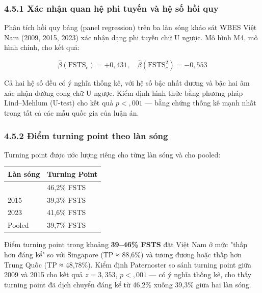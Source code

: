 \documentclass[12pt,a4paper]{article}
\begin{document}
\hypertarget{451-xuxe1c-nhux1eadn-quan-hux1ec7-phi-tuyux1ebfn-vuxe0-hux1ec7-sux1ed1-hux1ed3i-quy}{%
\subsubsection{4.5.1 Xác nhận quan hệ phi tuyến và hệ số hồi
quy}\label{451-xuxe1c-nhux1eadn-quan-hux1ec7-phi-tuyux1ebfn-vuxe0-hux1ec7-sux1ed1-hux1ed3i-quy}}

Phân tích hồi quy bảng (panel regression) trên ba làn sóng khảo sát WBES
Việt Nam (2009, 2015, 2023) xác nhận dạng phi tuyến chữ U ngược. Mô hình
M4, mô hình chính, cho kết quả:

\[\hat{\beta}(\text{FSTS}_c) = +0{,}431, \quad \hat{\beta}(\text{FSTS}_c^2) = -0{,}553\]

Cả hai hệ số đều có ý nghĩa thống kê, với hệ số bậc nhất dương và bậc
hai âm xác nhận đường cong chữ U ngược. Kiểm định hình thức bằng phương
pháp Lind--Mehlum (U-test) cho kết quả \(p < {,}001\) --- bằng chứng
thống kê mạnh nhất trong tất cả các mẫu quốc gia của luận án.

\hypertarget{452-ux111iux1ec3m-turning-point-theo-luxe0n-suxf3ng}{%
\subsubsection{4.5.2 Điểm turning point theo làn
sóng}\label{452-ux111iux1ec3m-turning-point-theo-luxe0n-suxf3ng}}

Turning point được ước lượng riêng cho từng làn sóng và cho pooled:

\begin{longtable}[]{@{}ll@{}}
\toprule\noalign{}
Làn sóng & Turning Point \\
\midrule\noalign{}
\endhead
\bottomrule\noalign{}
\endlastfoot
2009 & 46,2\% FSTS \\
2015 & 39,3\% FSTS \\
2023 & 41,6\% FSTS \\
Pooled & 39,7\% FSTS \\
\end{longtable}

Điểm turning point trong khoảng \textbf{39--46\% FSTS} đặt Việt Nam ở
mức "thấp hơn đáng kể" so với Singapore (TP ≈ 88,6\%) và tương đương
hoặc thấp hơn Trung Quốc (TP ≈ 48,78\%). Kiểm định Paternoster so sánh
turning point giữa 2009 và 2015 cho kết quả \(z = 3{,}353\),
\(p < {,}001\) --- có ý nghĩa thống kê, cho thấy turning point đã dịch
chuyển đáng kể từ 46,2\% xuống 39,3\% giữa hai làn sóng.
\end{document}
